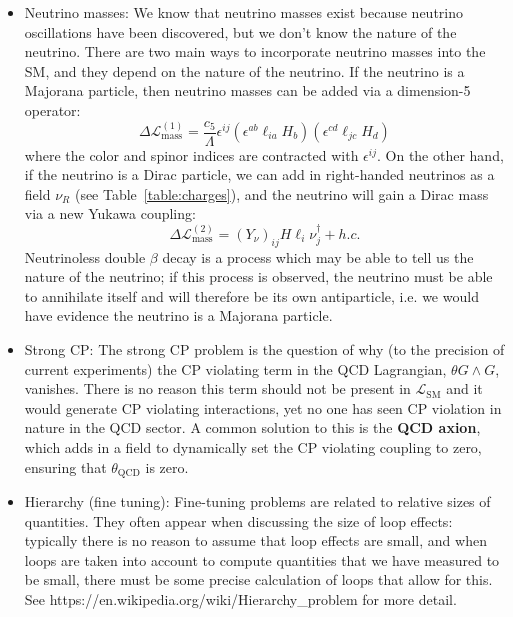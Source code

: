 \documentclass[11pt, oneside]{article}   	%
\theoremstyle{definition}
\numberwithin{equation}{subsection}		%
\begin{document}
\begin{itemize}
	\item Neutrino masses: We know that neutrino masses exist because neutrino oscillations have been discovered, but we don't know 
	the nature of the neutrino. There are two main ways to incorporate neutrino masses into the SM, and they depend on the nature of the 
	neutrino. If the neutrino is a Majorana particle, then neutrino masses can be added via a dimension-5 operator:
	\begin{equation}
		\Delta\mathcal L^{(1)}_\mathrm{mass} = \frac{c_5}{\Lambda} \epsilon^{ij}(\epsilon^{ab} \ell_{ia} H_b) (\epsilon^{cd} \ell_{jc} H_d)
	\end{equation}
	where the color and spinor indices are contracted with $\epsilon^{ij}$. On the other hand, if the neutrino is a Dirac particle, we can 
	add in right-handed neutrinos as a field $\nu_R$ (see Table~\ref{table:charges}), and the neutrino will gain a Dirac mass via a new 
	Yukawa coupling:
	\begin{equation}
		\Delta\mathcal L^{(2)}_\mathrm{mass} = (Y_\nu)_{ij} H\ell_i \nu_j^\dagger + h.c. 
	\end{equation}
	Neutrinoless double $\beta$ decay is a process which may be able to tell us the nature of the neutrino; if this process is observed, 
	the neutrino must be able to annihilate itself and will therefore be its own antiparticle, i.e. we would have evidence the neutrino is 
	a Majorana particle. 
	\item Strong CP: The strong CP problem is the question of why (to the precision of current experiments) the CP violating term 
	in the QCD Lagrangian, $\theta G\wedge G$, vanishes. There is no reason this term should not be present in 
	$\mathcal L_\mathrm{SM}$ and it would generate CP violating interactions, yet no one has seen CP violation in nature in the QCD 
	sector. A common solution to this is the \textbf{QCD axion}, which adds in a field to dynamically set the CP violating coupling to zero, 
	ensuring that $\theta_\mathrm{QCD}$ is zero. 
	\item Hierarchy (fine tuning): Fine-tuning problems are related to relative sizes of quantities. They often appear when discussing the 
	size of loop effects: typically there is no reason to assume that loop effects are small, and when loops are taken into account to 
	compute quantities that we have measured to be small, there must be some precise calculation of loops that allow for this. 
	See https://en.wikipedia.org/wiki/Hierarchy\_problem for more detail.
\end{itemize}
\end{document}

